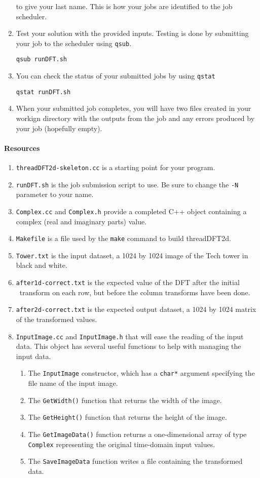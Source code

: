 \documentclass[10pt]{article}
\begin{document}
\begin{enumerate}
to give your last name.  This is how your jobs are identified to the
job scheduler.
\item Test your solution
with the provided inputs.  Testing is done by submitting your job to
the scheduler using {\tt qsub}.
\begin{verbatim}
qsub runDFT.sh
\end{verbatim}
\item You can check the status of your submitted jobs by using {\tt qstat}
\begin{verbatim}
qstat runDFT.sh
\end{verbatim}
\item When your submitted job completes, you will have two files created
in your workign directory with the outputs from the job and any errors produced by your job (hopefully
empty).
\end{enumerate}

\paragraph{Resources}
\begin{enumerate}
\item {\tt threadDFT2d-skeleton.cc} is a starting point for your program.
\item {\tt runDFT.sh} is the job submission script to use.  Be sure to change
the {\tt -N} parameter to your name.
\item {\tt Complex.cc} and {\tt Complex.h} provide a completed C++
object containing a complex (real and imaginary parts) value.
\item {\tt Makefile} is a file used by the {\tt make} command to
build threadDFT2d.
\item {\tt Tower.txt} is the input dataset, a 1024 by 1024 image of the
Tech tower in black and white.
\item {\tt after1d-correct.txt} is the expected value of the DFT
after the initial \od\ transform on each row, but before the column
transforms have been done.
\item {\tt after2d-correct.txt} is the expected output dataset,
a 1024 by 1024 matrix of the transformed values.
\item {\tt InputImage.cc} and {\tt InputImage.h} that will ease the reading
of the input data.  This object has several useful functions to help with
managing the input data.
\begin{enumerate}
\item The {\tt InputImage} constructor, which has a {\tt char*} argument
specifying the file name of the input image.
\item The {\tt GetWidth()} function that returns the width of the image.
\item The {\tt GetHeight()} function that returns the height of the image.
\item The {\tt GetImageData()} function returns a one-dimensional array
of type {\tt Complex} representing the original time-domain input values.
\item The {\tt SaveImageData} function writes a file containing the
transformed data.
\end{enumerate}
\end{enumerate}
\end{document}
